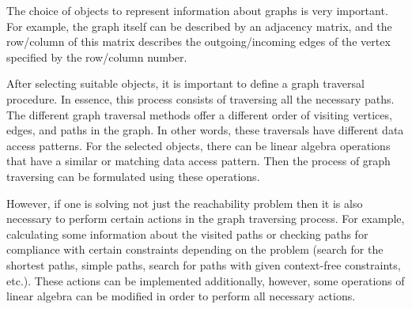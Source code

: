 The choice of objects to represent information about graphs is very important. For example, the graph itself can be described by an adjacency matrix, and the row/column of this matrix describes the outgoing/incoming edges of the vertex specified by the row/column number.

After selecting suitable objects, it is important to define a graph traversal procedure. In essence, this process consists of traversing all the necessary paths. The different graph traversal methods offer a different order of visiting vertices, edges, and paths in the graph. In other words, these traversals have different data access patterns. For the selected objects, there can be linear algebra operations that have a similar or matching data access pattern. Then the process of graph traversing can be formulated using these operations.

However, if one is solving not just the reachability problem then it is also necessary to perform certain actions in the graph traversing process. For example, calculating some information about the visited paths or checking paths for compliance with certain constraints depending on the problem (search for the shortest paths, simple paths, search for paths with given context-free constraints, etc.). These actions can be implemented additionally, however, some operations of linear algebra can be modified in order to perform all necessary actions. %

